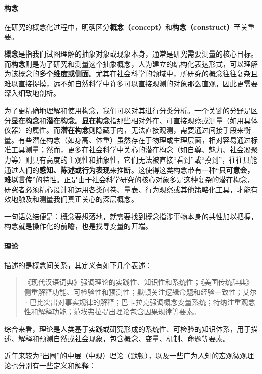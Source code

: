 \paragraph*{构念}

在研究的概念化过程中，明确区分\textbf{概念（concept）}和\textbf{构念（construct）}至关重要。

\textbf{概念}是指我们试图理解的抽象对象或现象本身，通常是研究需要测量的核心目标。而\textbf{构念}则是为了研究和测量这个抽象概念，人为建立的结构化表达形式，可以理解为该概念的\textbf{多个维度或侧面}。尤其在社会科学的领域中，所研究的概念往往复杂且难以直接捉摸，远不如自然科学中许多可以直接观测的对象那么直观，因此更需要深入细致地剖析。

为了更精确地理解和使用构念，我们可以对其进行分类分析。一个关键的分野是区分\textbf{显在构念}和\textbf{潜在构念}。\textbf{显在构念}指那些相对外在、可直接观察或测量（如用具体仪器）的属性。而\textbf{潜在构念}则隐藏于内，无法直接观测，需要通过间接手段来衡量。有些潜在构念（如身高、体重）虽然存在于物理或生理层面，相对容易通过标准工具测量；然而，更多在社会科学中关心的潜在构念（如自尊、魅力、社会凝聚力等）则具有高度的主观性和抽象性，它们无法被直接``看到''或``摸到''，往往只能通过人们的\textbf{感知、陈述或行为表现}来推断。这使得这类构念带有一种``\textbf{只可意会，难以言传}''的特性。正是由于社会科学研究的核心对象多是这种复杂的潜在构念，研究者必须精心设计和运用各类问卷、量表、行为观察或其他策略化工具，才能有效地触及和测量我们真正关心的深层概念。

一句话总结便是：概念要想落地，就需要找到概念指涉事物本身的共性加以把握，构念就是操作化的前瞻，也是找寻变量的开端。

\paragraph*{理论}

描述的是概念间关系，其定义有如下几个表述：

\begin{quote}
	{\fangsong 《现代汉语词典》强调理论的实践性、知识性和系统性；《美国传统辞典》侧重解释功能、可检验性和预测性；默顿关注逻辑命题和经验一致性；艾尔·巴比突出对事实规律的解释；巴卡拉克强调概念变量系统；特纳注重观念性和解释功能；范埃弗拉提出理论包含因果规律等要素。
	}
\end{quote}

综合来看，理论是人类基于实践或研究形成的系统性、可检验的知识体系，用于描述、解释和预测自然或社会现象，包含概念、变量、机制、命题等要素。

近年来较为``出圈''的中层（中观）理论（默顿），以及一些广为人知的宏观微观理论也分别有一些定义和解释：

